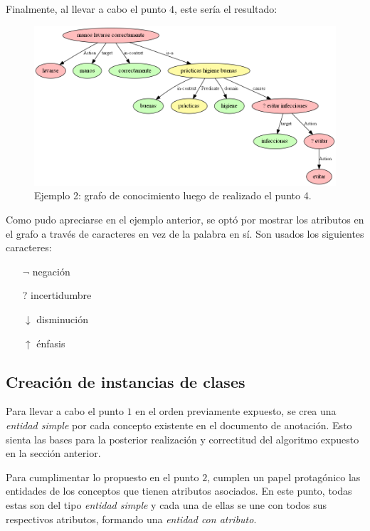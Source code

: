 Finalmente, al llevar a cabo el punto $4$, este sería el resultado:
\begin{figure}[H]
	\begin{center}
		\includegraphics[width=\textwidth]{graphics/knowledge_graph_example2_4.png}
		\caption[Ejemplo 2: grafo de conocimiento luego de realizado el punto 4]{Ejemplo 2: grafo de conocimiento luego de realizado el punto 4.}
		\label{fig:knowledge_graph2.4}
	\end{center}
\end{figure}

Como pudo apreciarse en el ejemplo anterior, se optó por mostrar los atributos en el grafo a través de caracteres en vez de la palabra en sí. Son usados los siguientes caracteres:
\begin{itemize}
	\item[$\lnot$] negación
	\item[?] incertidumbre
	\item[$\downarrow$] disminución
	\item[$\uparrow$] énfasis
\end{itemize}

\subsection{Creación de instancias de clases}\label{section:ontology_construction}
Para llevar a cabo el punto $1$ en el orden previamente expuesto, se crea una \textit{entidad simple} por cada concepto existente en el documento de anotación. Esto sienta las bases para la posterior realización y correctitud del algoritmo expuesto en la sección anterior.

Para cumplimentar lo propuesto en el punto $2$, cumplen un papel protagónico las entidades de los conceptos que tienen atributos asociados. En este punto, todas estas son del tipo \textit{entidad simple} y cada una de ellas se une con todos sus respectivos atributos, formando una \textit{entidad con atributo}.

